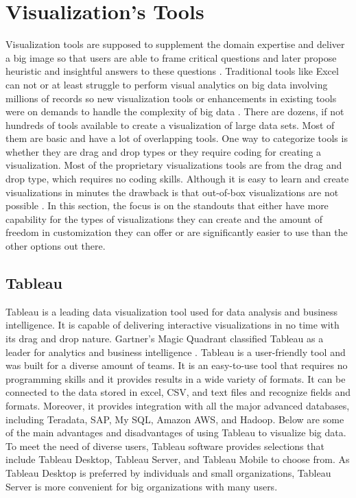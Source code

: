 \section{Visualization's Tools}

Visualization tools are supposed to supplement the domain expertise and deliver a big image so that users are able to frame critical questions and later propose heuristic and insightful answers to these questions \cite{kung2015visualization}. Traditional tools like Excel can not or at least struggle to perform visual analytics on big data involving millions of records so new visualization tools or enhancements in existing tools were on demands to handle the complexity of big data \cite{nair2016interactive}. There are dozens, if not hundreds of tools available to create a visualization of large data sets. Most of them are basic and have a lot of overlapping tools. One way to categorize tools is whether they are drag and drop types or they require coding for creating a visualization. Most of the proprietary visualizations tools are from the drag and drop type, which requires no coding skills. Although it is easy to learn and create visualizations in minutes the drawback is that out-of-box visualizations are not possible \cite{nair2016interactive}. In this section, the focus is on the standouts that either have more capability for the types of visualizations they can create and the amount of freedom in customization they can offer or are significantly easier to use than the other options out there. 

\subsection{Tableau}

Tableau is a leading data visualization tool used for data analysis and business intelligence. It is capable of delivering interactive visualizations in no time with its drag and drop nature. Gartner’s Magic Quadrant classified Tableau as a leader for analytics and business intelligence \cite{parenteau2016magic}. Tableau is a user-friendly tool and was built for a diverse amount of teams. It is an easy-to-use tool that requires no programming skills and it provides results in a wide variety of formats. It can be connected to the data stored in excel, CSV, and text files and recognize fields and formats. Moreover, it provides integration with all the major advanced databases, including Teradata, SAP, My SQL, Amazon AWS, and Hadoop. Below are some of the main advantages and disadvantages of using Tableau to visualize big data. To meet the need of diverse users, Tableau software provides selections that include Tableau Desktop, Tableau Server, and Tableau Mobile to choose from. As Tableau Desktop is preferred by individuals and small organizations, Tableau Server is more convenient for big organizations with many users.

